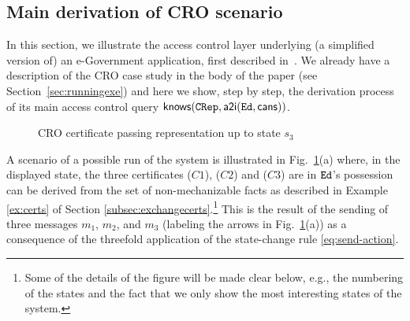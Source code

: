 \documentclass[conference]{llncs}
\newcommand{\Ed}{\ensuremath \mathtt{Ed}}
\newcommand{\CRep}{\ensuremath \mathtt{CRep}}
\newcommand{\canstoredoc}{\ensuremath \mathsf{cans}}
\newcommand{\know}{\ensuremath \mathsf{knows}}
\newcommand{\atoi}{\ensuremath \mathsf{a2i}}
\newcommand{\CRO}{CRO}
\begin{document}
{\subsection{Main derivation of \CRO{} scenario}
\label{CR}

In this section, we illustrate the access control layer underlying (a
simplified version of) an e-Government application, first described
in~\cite{avantssar}. We already have a description of the \CRO{} case study in
the body of the paper (see Section~\ref{sec:runningexe}) and here we
show, step by step, the derivation process of its main access control query 
$\know(\CRep,\atoi(\Ed,\canstoredoc))$.



\begin{figure}[t] \center
 \qquad\qquad\qquad
{}\qquad\qquad 
\caption{\CRO{} certificate passing representation up to state $s_3$ \label{fig:CRO1}}
\end{figure}


A scenario of a possible run of the system is illustrated in
Fig.~\ref{fig:CRO1}(a) where, in the displayed state, the three
certificates ($C1$), ($C2$) and ($C3$) are in $\Ed$'s possession can be derived from the set of non-mechanizable facts as described in Example \ref{ex:certs} of Section \ref{subsec:exchangecerts}.\footnote{Some of the details of
the figure will be made clear below, e.g., the numbering of the states
and the fact that we only show the most interesting states of the
system.}
This is the result of the sending of three messages $m_1$, $m_2$, and $m_3$
(labeling the arrows in Fig.~\ref{fig:CRO1}(a)) as a consequence of the threefold application of the state-change rule \eqref{eq:send-action}.

}
\end{document}
